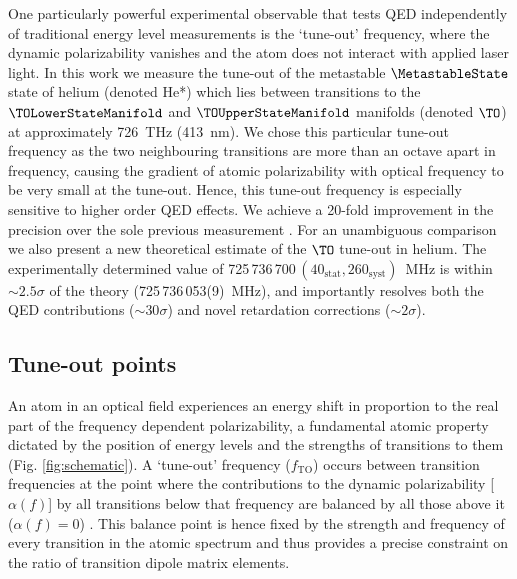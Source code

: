 		One particularly powerful experimental observable that tests QED independently of traditional energy level measurements is the `tune-out' frequency, where the dynamic polarizability vanishes and the atom does not interact with applied laser light.  
	In this work we measure the tune-out of the metastable $\MetastableState$ state of helium (denoted He*) which lies between transitions to the $\TOLowerStateManifold$ and $\TOUpperStateManifold$ manifolds (denoted $\TO$) at approximately 726~THz (413~nm). We chose this particular tune-out frequency as the two neighbouring transitions are more than an octave apart in frequency, causing the gradient of atomic polarizability with optical frequency to be very small at the tune-out. Hence, this tune-out frequency is especially sensitive to higher order QED effects. We achieve a 20-fold improvement in the precision over the sole previous measurement \cite{Henson15}.
	For an unambiguous comparison we also present a new theoretical estimate of the \(\TO\) tune-out in helium. The experimentally determined value of 725\,736\,700\,$(40_{\mathrm{stat}},260_{\mathrm{syst}})$~MHz is within \({\sim} 2.5\sigma\) of the theory (725\,736\,053(9)~MHz), and importantly resolves both the QED contributions (\({\sim} 30 \sigma\)) and novel retardation corrections (\({\sim} 2 \sigma\)).


\subsection{Tune-out points}


	An atom in an optical field experiences an energy shift in proportion to the real part of the frequency dependent polarizability, a fundamental atomic property dictated by the position of energy levels and the strengths of transitions to them (Fig. \ref{fig:schematic}). 
	A ‘tune-out’ frequency ($f_\mathrm{TO}$) occurs between transition frequencies at the point where the contributions to the dynamic polarizability [$\alpha(f)$] by all transitions below that frequency are balanced by all those above it ($\alpha(f)=0$) \cite{LeBlanc07}. 
	This balance point is hence fixed by the strength and frequency of every transition in the atomic spectrum and thus provides a precise constraint on the ratio of transition dipole matrix elements. 

